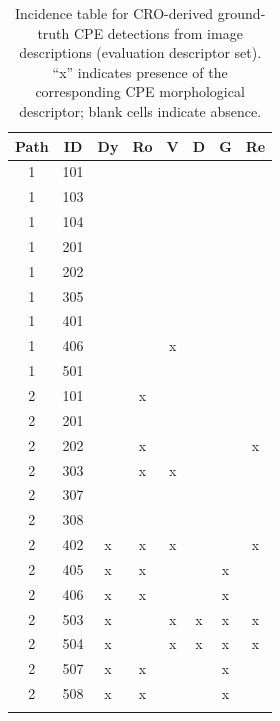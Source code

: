 \begin{table}[htbp]
\centering
\small
\caption{Incidence table for CRO-derived ground-truth CPE detections from image descriptions (evaluation descriptor set). ``x'' indicates presence of the corresponding CPE morphological descriptor; blank cells indicate absence.}
\label{tab:cro-cpe-detections}

\begin{tabular}{cc*{6}{c}}
\toprule
\textbf{Path} & \textbf{ID} & \textbf{Dy} & \textbf{Ro} & \textbf{V} & \textbf{D} & \textbf{G} & \textbf{Re} \\
\midrule
\arrayrulecolor{gray!30}
1 & 101 &  &  &  &  &  &  \\
\hline
1 & 103 &  &  &  &  &  &  \\
\hline
1 & 104 &  &  &  &  &  &  \\
\hline
1 & 201 &  &  &  &  &  &  \\
\hline
1 & 202 &  &  &  &  &  &  \\
\hline
1 & 305 &  &  &  &  &  &  \\
\hline
1 & 401 &  &  &  &  &  &  \\
\hline
1 & 406 &  &  & x &  &  &  \\
\hline
1 & 501 &  &  &  &  &  &  \\
\hline
2 & 101 &  & x &  &  &  &  \\
\hline
2 & 201 &  &  &  &  &  &  \\
\hline
2 & 202 &  & x &  &  &  & x \\
\hline
2 & 303 &  & x & x &  &  &  \\
\hline
2 & 307 &  &  &  &  &  &  \\
\hline
2 & 308 &  &  &  &  &  &  \\
\hline
2 & 402 & x & x & x &  &  & x \\
\hline
2 & 405 & x & x &  &  & x &  \\
\hline
2 & 406 & x & x &  &  & x &  \\
\hline
2 & 503 & x &  & x & x & x & x \\
\hline
2 & 504 & x &  & x & x & x & x \\
\hline
2 & 507 & x & x &  &  & x &  \\
\hline
2 & 508 & x & x &  &  & x &  \\
\arrayrulecolor{black}
\bottomrule
\end{tabular}

\end{table}